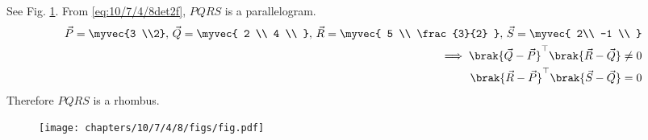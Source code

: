 \solution 
See Fig. \ref{fig:10/7/4/8Fig3}. From 
  \eqref{eq:10/7/4/8det2f}, $PQRS$ is a parallelogram.
\begin{align}
  \vec{P}  = 
 \myvec{3 \\2},\, 
 \vec{Q}  = \myvec{
 2 \\
 4 \\
 } ,\,
 \vec{R}  = \myvec{
 5 \\
 \frac{3}{2}
 }   
  ,\,
 \vec{S}  = \myvec{
 2\\
 -1 \\
 }   
 \\
	\implies 
 \brak{\vec{Q}-\vec{P}}^\top\brak{\vec{R}-\vec{Q}}  \neq 0
 \\
 \brak{\vec{R}-\vec{P}}^\top\brak{\vec{S}-\vec{Q}}  = 0
\end{align}
Therefore $PQRS$ is a rhombus.
\begin{figure}[H]
	\begin{center}
		\texttt{[image: chapters/10/7/4/8/figs/fig.pdf]}
	\end{center}
\caption{}
\label{fig:10/7/4/8Fig3}
\end{figure}

